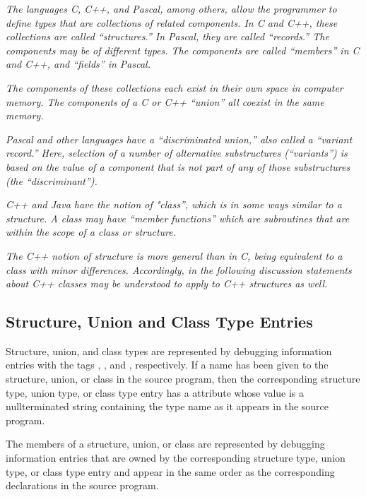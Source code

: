 \textit{The languages C, C++, and Pascal, among others, allow the
programmer to define types that are collections of related
components. In C and C++, these collections are called
“structures.” In Pascal, they are called “records.”
The components may be of different types. The components are
called “members” in C and C++, and “fields” in Pascal.}

\textit{The components of these collections each exist in their
own space in computer memory. The components of a C or C++
“union” all coexist in the same memory.}

\textit{Pascal and other languages have a “discriminated union,”
also called a “variant record.” Here, selection of a
number of alternative substructures (“variants”) is based
on the value of a component that is not part of any of those
substructures (the “discriminant”).}

\textit{C++ and Java have the notion of "class”, which is in some
ways similar to a structure. A class may have “member
functions” which are subroutines that are within the scope
of a class or structure.}

\textit{The C++ notion of structure is more general than in C, being
equivalent to a class with minor differences. Accordingly,
in the following discussion statements about C++ classes may
be understood to apply to C++ structures as well.}

\subsection{Structure, Union and Class Type Entries}
\label{chap:structureunionandclasstypeentries}


Structure, union, and class types are represented by debugging
information entries with 
the tags ,
, 
and ,
respectively. If a name has been given to the structure,
union, or class in the source program, then the corresponding
structure type, union type, or class type entry has a
 attribute whose value is a null\dash terminated string
containing the type name as it appears in the source program.

The members of a structure, union, or class are represented
by debugging information entries that are owned by the
corresponding structure type, union type, or class type entry
and appear in the same order as the corresponding declarations
in the source program.

